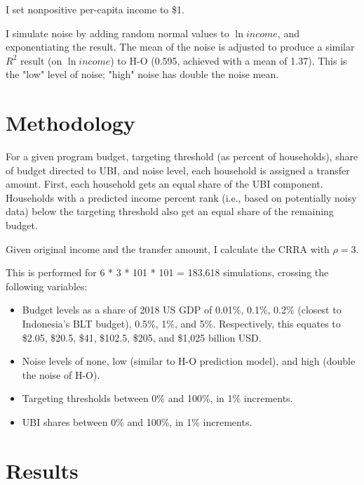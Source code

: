 \documentclass[12pt]{article}
\begin{document}
I set nonpositive per-capita income to \$1.

I simulate noise by adding random normal values to $\ln{income}$, and 
exponentiating the result.
The mean of the noise is adjusted to produce a 
similar $R^2$ result (on $\ln{income}$) to H-O (0.595, achieved with a mean of 
1.37).
This is the "low" level of noise; "high" noise has double the noise mean.


\section{Methodology} \label{sec:methodology}

For a given program budget, targeting threshold (as percent of households), 
share of budget directed to UBI, and noise level, each household is assigned a 
transfer amount. First, each household gets an equal share of the UBI 
component. Households with a predicted income percent rank (i.e., based on 
potentially noisy data) below the targeting threshold also get an equal share 
of the remaining budget.

Given original income and the transfer amount, I calculate the CRRA with 
$\rho=3$.

This is performed for 6 * 3 * 101 * 101 = 183,618 simulations, crossing the 
following variables:

\begin{itemize}
	
	\item Budget levels as a share of 2018 US GDP of 0.01\%, 0.1\%, 0.2\% 
	(closest to 
	Indonesia's BLT budget), 0.5\%, 1\%, and 5\%. Respectively, this equates to 
	\$2.05, \$20.5, \$41, \$102.5, \$205, and \$1,025 billion USD.
	
	\item Noise levels of none, low (similar to H-O prediction model), and high 
	(double the noise of H-O).
	
	\item Targeting thresholds between 0\% and 100\%, in 1\% increments.
	
	\item UBI shares between 0\% and 100\%, in 1\% increments.
	
\end{itemize}


\section{Results} \label{sec:results}
\end{document}
